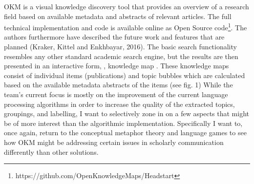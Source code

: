 OKM is a visual knowledge discovery tool that provides an overview of a research field based on available metadata and abstracts of relevant articles. The full technical implementation and code is available online as Open Source code\footnote{https://github.com/OpenKnowledgeMaps/Headstart}. The authors furthermore have described the future work and features that are planned (Kraker, Kittel and Enkhbayar, 2016). The basic search functionality resembles any other standard academic search engine, but the results are then presented in an interactive form, , knowledge map . These knowledge maps consist of individual items
(publications) and topic bubbles which are calculated based on the available metadata abstracts of the items (see fig. 1) While the team’s current focus is mostly on the improvement of the current language processing algorithms in order to increase the quality of the extracted topics, groupings, and labelling, I want to selectively zone in on a few aspects that might be of more interest than the algorithmic implementation. Specifically I want to, once again, return to the
conceptual metaphor theory and language games to see how OKM might be addressing certain issues in scholarly communication differently than other solutions.